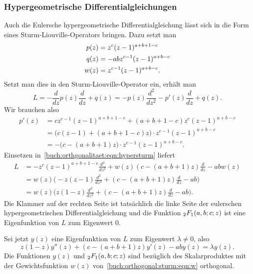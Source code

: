 \subsubsection{Hypergeometrische Differentialgleichungen}
Auch die Eulersche hypergeometrische Differentialgleichung
%
%
lässt sich in die Form eines Sturm-Liouville-Operators
%
bringen.
Dazu setzt man
\begin{align}
p(z)
&=
z^c(z-1)^{a+b+1-c}
\notag
\\
q(z)
&=
-abz^{c-1}(z-1)^{a+b-c}
\notag
\\
w(z)
&=
z^{c-1}(z-1)^{a+b-c}.
\label{buch:orthogonal:sturm:eqn:w}
\end{align}
Setzt man dies in den Sturm-Liouville-Operator ein, erhält man
\begin{equation}
L
=
-\frac{d}{dz}p(z)\frac{d}{dz} + q(z)
=
-p(z)\frac{d^2}{dz^2}
-p'(z)\frac{d}{dz}
+q(z).
\label{buch:orthgonalitaet:eqn:hypersturm}
\end{equation}
Wir brauchen also
\begin{align*}
p'(z)
&=
cz^{c-1}(z-1)^{a+b+1-c}
+
(a+b+1-c)
z^c
(z-1)^{a+b-c}
\\
&=
\bigl(
c(z-1)+
(a+b+1-c)z
\bigr)
\cdot
z^{c-1}(z-1)^{a+b-c}
\\
&=
-
\bigl(
c-(a+b+1)z
\bigr)
\cdot
z^{c-1}(z-1)^{a+b-c}.
\end{align*}
Einsetzen in~\eqref{buch:orthgonalitaet:eqn:hypersturm} liefert
\begin{align*}
L
&=
-z^c(z-1)^{a+b+1-c} \frac{d^2}{dz^2}
+
w(z)
(c-(a+b+1)z)
\frac{d}{dz}
-
abw(z)
\\
&=
w(z)
\biggl(
-
z(z-1)
\frac{d^2}{dz^2}
+
(c-(a+b+1)z)
\frac{d}{dz}
-ab
\biggr)
\\
&=
w(z)
\biggl(
z(1-z)
\frac{d^2}{dz^2}
+
(c-(a+b+1)z)
\frac{d}{dz}
-ab
\biggr).
\end{align*}
Die Klammer auf der rechten Seite ist tatsächlich die linke Seite der
eulerschen hypergeometrischen Differentialgleichung und
die Funktion $\mathstrut_2F_1(a,b;c;z)$ ist eine Eigenfunktion
von $L$ zum Eigenwert $0$.

Sei jetzt $y(z)$ eine Eigenfunktion von $L$ zum Eigenwert $\lambda\ne 0$,
also
\begin{equation}
z(1-z)y''(z) + (c-(a+b+1)z)y'(z) - ab y(z) = \lambda y(z).
\label{buch:orthogonal:hypergeometrisch:eqn:gl}
\end{equation}
Die Funktionen $y(z)$ und $\mathstrut_2F_1(a,b;c;z)$ sind bezüglich
des Skalarproduktes mit der Gewichtsfunktion $w(z)$
von~\eqref{buch:orthogonal:sturm:eqn:w} orthogonal.

